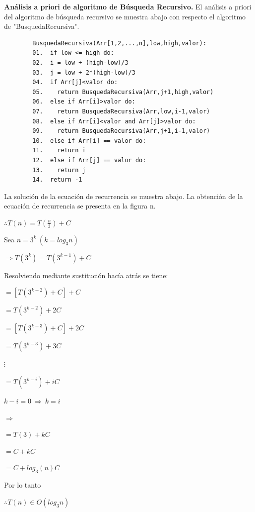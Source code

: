 \documentclass[12pt,twoside]{article}
\begin{document}
\newpage


\textbf{Análisis a priori de algoritmo de Búsqueda Recursivo.} 
El análisis a priori del algoritmo de búsqueda recursivo se muestra abajo con respecto el algoritmo de "BusquedaRecursiva". 
\par
\begin{center}
  \begin{verbatim}
        BusquedaRecursiva(Arr[1,2,...,n],low,high,valor):
        01.  if low <= high do:
        02.  i = low + (high-low)/3
        03.  j = low + 2*(high-low)/3
        04.  if Arr[j]<valor do:
        05.    return BusquedaRecursiva(Arr,j+1,high,valor)
        06.  else if Arr[i]>valor do:
        07.    return BusquedaRecursiva(Arr,low,i-1,valor)
        08.  else if Arr[i]<valor and Arr[j]>valor do:
        09.    return BusquedaRecursiva(Arr,j+1,i-1,valor)
        10.  else if Arr[i] == valor do:
        11.    return i
        12.  else if Arr[j] == valor do:
        13.    return j
        14.  return -1
  \end{verbatim}
  \end{center}
\par

La solución de la ecuación de recurrencia se muestra abajo. La obtención de la ecuación de recurrencia se presenta en la figura n.

\begin{center}
  $\therefore T(n)=T(\frac{n}{3})+C$

  Sea $n=3^k\ (k=log_3 n)$
  
  $\Rightarrow T(3^k)=T(3^{k-1})+C$
  \par
  Resolviendo mediante sustitución hacía atrás se tiene:

  $=[T(3^{k-2})+C]+C$

  $=T(3^{k-2})+2C$

  $=[T(3^{k-3})+C]+2C$

  $=T(3^{k-3})+3C$

  $\vdots$

  $=T(3^{k-i})+iC$

  $k-i=0\ \Rightarrow \ k=i$

  $\Rightarrow$

  $=T(3)+kC$

  $=C+kC$

  $=C+log_3(n)C$

  Por lo tanto 
  
  $\therefore T(n)\in O(log_3n)$
\end{center}
\end{document}
